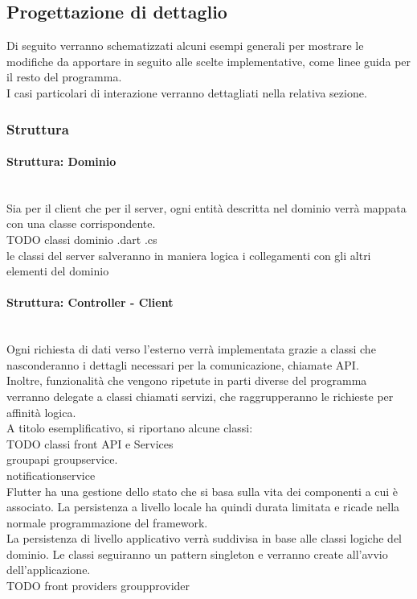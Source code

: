\newpage
\subsection{Progettazione di dettaglio}

Di seguito verranno schematizzati alcuni esempi generali per mostrare le modifiche da apportare in seguito alle scelte implementative, come linee guida per il resto del programma.\\
I casi particolari di interazione verranno dettagliati nella relativa sezione.
\subsubsection{Struttura}
\paragraph{Struttura: Dominio}\mbox{}\\

Sia per il client che per il server, ogni entità descritta nel dominio verrà mappata con una classe corrispondente.\\
TODO classi dominio .dart .cs\\
le classi del server salveranno in maniera logica i collegamenti con gli altri elementi del dominio\\

\paragraph{Struttura: Controller - Client}\mbox{}\\
Ogni richiesta di dati verso l'esterno verrà implementata grazie a classi che nasconderanno i dettagli necessari per la comunicazione, chiamate API.\\
Inoltre, funzionalità che vengono ripetute in parti diverse del programma verranno delegate a classi chiamati servizi, che raggrupperanno le richieste per affinità logica.\\
A titolo esemplificativo, si riportano alcune classi:\\
TODO classi front API e Services\\ groupapi groupservice.\\
notificationservice\\

Flutter ha una gestione dello stato che si basa sulla vita dei componenti a cui è associato. La persistenza a livello locale ha quindi durata limitata e ricade nella normale programmazione del framework.\\
La persistenza di livello applicativo verrà suddivisa in base alle classi logiche del dominio. Le classi seguiranno un pattern singleton e verranno create all'avvio dell'applicazione.\\
TODO front providers groupprovider\\


